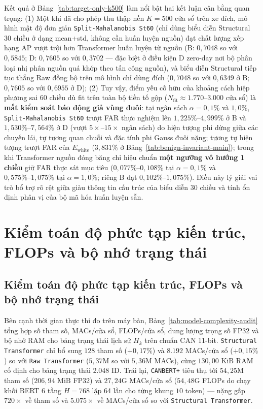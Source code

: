 \documentclass[12pt, a4paper, reqno, oneside]{book}
\DeclareRobustCommand{\code}[1]{\nolinkurl{#1}}
\begin{document}
{Kết quả ở Bảng~\ref{tab:target-only-k500} làm nổi bật hai kết luận cân bằng quan trọng: (1) Một khi đã cho phép thu thập nền $K=500$ cửa sổ trên xe đích, mô hình mật độ đơn giản \code{Split-Mahalanobis St60} (chỉ dùng biểu diễn Structural 30 chiều ở dạng mean+std, không cần huấn luyện nguồn) đạt chất lượng xếp hạng AP vượt trội hơn Transformer huấn luyện từ nguồn (B: $0{,}7048$ so với $0{,}5845$; D: $0{,}7605$ so với $0{,}3702$ --- đặc biệt ở điều kiện D zero-day nơi bộ phân loại nhị phân nguồn quá khớp theo tấn công nguồn), và biểu diễn Structural tiếp tục thắng Raw đồng bộ trên mô hình chỉ dùng đích ($0{,}7048$ so với $0{,}6349$ ở B; $0{,}7605$ so với $0{,}6955$ ở D); (2) Tuy vậy, điểm yếu cố hữu của khoảng cách hiệp phương sai 60 chiều dù fit trên toàn bộ tiền tố gộp ($N_{\text{fit}} \approx 1.770\text{--}3.000$ cửa sổ) là \textbf{mất kiểm soát báo động giả vùng đuôi}: tại ngân sách $\alpha=0{,}1\%$ và $1{,}0\%$, \code{Split-Mahalanobis St60} trượt FAR thực nghiệm lên $1{,}225\%\text{--}4{,}999\%$ ở B và $1{,}530\%\text{--}7{,}564\%$ ở D (vượt $5\times$--$15\times$ ngân sách) do hiện tượng phi dừng giữa các chuyến lái, tự tương quan chuỗi và đặc tính phi Gauss đuôi nặng; tương tự hiện tượng trượt FAR của $E_{\text{white}}$ ($3{,}831\%$ ở Bảng~\ref{tab:benign-invariant-main}); trong khi Transformer nguồn đóng băng chỉ hiệu chuẩn \textbf{một ngưỡng vô hướng 1 chiều} giữ FAR thực sát mục tiêu ($0{,}077\%\text{--}0{,}108\%$ tại $\alpha=0{,}1\%$ và $0{,}575\%\text{--}1{,}075\%$ tại $\alpha=1{,}0\%$; riêng B đạt $0{,}102\%\text{--}1{,}075\%$). Điều này lý giải vai trò bổ trợ rõ rệt giữa giàu thông tin cấu trúc của biểu diễn 30 chiều và tính ổn định phân vị của bộ mã hóa huấn luyện sẵn.

\section{Kiểm toán độ phức tạp kiến trúc, FLOPs và bộ nhớ trạng thái}\label{subsec:complexity-audit}

\subsection{Kiểm toán độ phức tạp kiến trúc, FLOPs và bộ nhớ trạng thái}\label{subsec:complexity-audit}
Bên cạnh thời gian thực thi đo trên máy bàn, Bảng~\ref{tab:model-complexity-audit} tổng hợp số tham số, MACs/cửa sổ, FLOPs/cửa sổ, dung lượng trọng số FP32 và bộ nhớ RAM cho bảng trạng thái lịch sử $H_k$ trên chuẩn CAN 11-bit. \code{Structural Transformer} chỉ bổ sung $128$ tham số ($+0{,}17\%$) và $8.192$ MACs/cửa sổ ($+0{,}15\%$) so với \code{Raw Transformer} ($5{,}37\text{M}$ so với $5{,}36\text{M}$ MACs), cùng $130{,}00\text{ KiB}$ RAM cố định cho bảng trạng thái 2.048 ID. Trái lại, \code{CANBERT+} tiêu thụ tới $54{,}25\text{M}$ tham số ($206{,}94\text{ MiB}$ FP32) và $27{,}24\text{G}$ MACs/cửa sổ ($54{,}48\text{G}$ FLOPs do chạy khối BERT 6 tầng $H=768$ lặp 64 lần cho từng khung $10$ token) — nặng gấp $720\times$ về tham số và $5.075\times$ về MACs/cửa sổ so với \code{Structural Transformer}.

}
\end{document}
